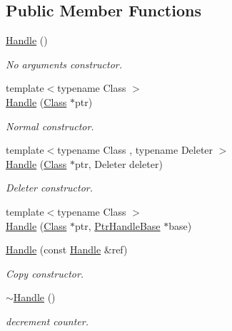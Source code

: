 \subsection*{Public Member Functions}
\begin{DoxyCompactItemize}
\item 
\hyperlink{classmocha_1_1_handle_a6b6fa11fae745cd62e5fa89583d468a2}{Handle} ()
\begin{DoxyCompactList}\small\item\em No arguments constructor. \end{DoxyCompactList}\item 
{\footnotesize template$<$typename Class $>$ }\\\hyperlink{classmocha_1_1_handle_a51ad9790078e4d57a11c095947243110}{Handle} (\hyperlink{classmocha_1_1_class}{Class} $\ast$ptr)
\begin{DoxyCompactList}\small\item\em Normal constructor. \end{DoxyCompactList}\item 
{\footnotesize template$<$typename Class , typename Deleter $>$ }\\\hyperlink{classmocha_1_1_handle_a307c83e0b57fa7185d305f7edac1ec1a}{Handle} (\hyperlink{classmocha_1_1_class}{Class} $\ast$ptr, Deleter deleter)
\begin{DoxyCompactList}\small\item\em Deleter constructor. \end{DoxyCompactList}\item 
{\footnotesize template$<$typename Class $>$ }\\\hyperlink{classmocha_1_1_handle_a7623048eb3ef9074a8748fd1cdc5887e}{Handle} (\hyperlink{classmocha_1_1_class}{Class} $\ast$ptr, \hyperlink{classmocha_1_1_ptr_handle_base}{PtrHandleBase} $\ast$base)
\item 
\hyperlink{classmocha_1_1_handle_ad6a7059f0912996aa72b857960985380}{Handle} (const \hyperlink{classmocha_1_1_handle}{Handle} \&ref)
\begin{DoxyCompactList}\small\item\em Copy constructor. \end{DoxyCompactList}\item 
\hyperlink{classmocha_1_1_handle_aa717ea98a75b0bcb4209bd93eac8467a}{$\sim$Handle} ()
\begin{DoxyCompactList}\small\item\em decrement counter. \end{DoxyCompactList}\item 

\end{DoxyCompactItemize}
